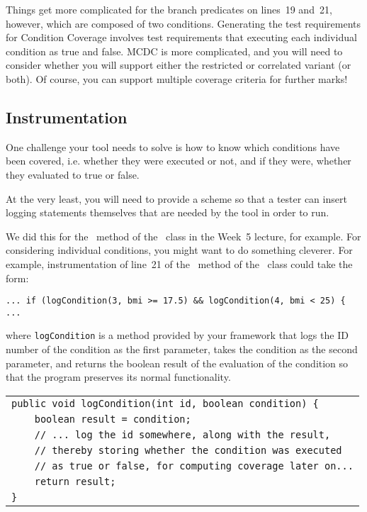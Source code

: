 Things get more complicated for the branch predicates on lines~19 and~21,
however, which are composed of two conditions. Generating the test requirements
for Condition Coverage involves test requirements that executing each individual
condition as true and false. MCDC is more complicated, and you will need to
consider whether you will support either the restricted or correlated variant
(or both). Of course, you can support multiple coverage criteria for further
marks! 


\subsection{Instrumentation}

One challenge your tool needs to solve is how to know which conditions have been
covered, i.e. whether they were executed or not, and if they were, whether they
evaluated to true or false. 

At the very least, you will need to provide a scheme so that a tester can insert
logging statements themselves that are needed by the tool in order to run. 

We did this for the \classifymethod~method of the \triangleclass~class in the
Week~5 lecture, for example. For considering individual conditions, you might
want to do something cleverer. For example, instrumentation of line~21 of the
\calculatemethod~method of the \bmicalculatorclass~class could take the form:

\begin{center}
{\tt \scriptsize ... if (logCondition(3, bmi >= 17.5) \&\& logCondition(4, bmi <
25) \{ ...} 
\end{center}

where {\tt logCondition} is a method provided by your framework that logs the ID
number of the condition as the first parameter, takes the condition as the
second parameter, and returns the boolean result of the evaluation of the
condition so that the program preserves its normal functionality. 

\begin{center} 
    \scriptsize
    \begin{tabular}{l}
        \toprule
        \verb$public void logCondition(int id, boolean condition) {$\\
        \verb$    boolean result = condition;$\\
        \verb$    // ... log the id somewhere, along with the result, $\\
        \verb$    // thereby storing whether the condition was executed$\\
        \verb$    // as true or false, for computing coverage later on...$\\
        \verb$    return result;$\\
        \verb$}$\\
        \bottomrule
    \end{tabular}
\end{center}


